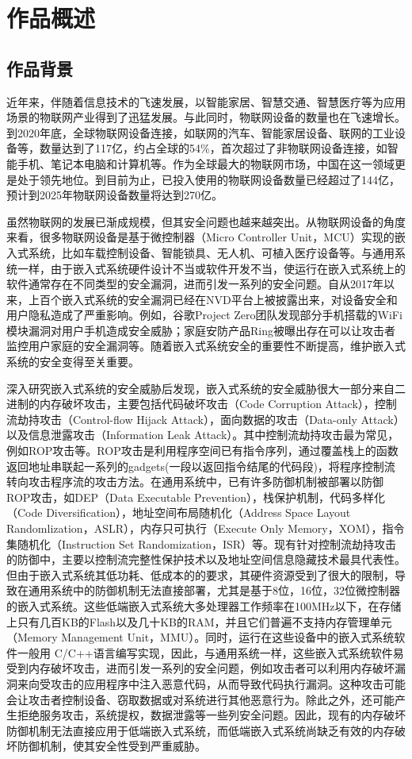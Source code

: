 \documentclass[12pt,a4paper]{ctexart}
\numberwithin{figure}{section}
\begin{document}
\section{作品概述}
\subsection{作品背景}
\par 近年来，伴随着信息技术的飞速发展，以智能家居、智慧交通、智慧医疗等为应用场景的物联网产业得到了迅猛发展。与此同时，物联网设备的数量也在飞速增长。到2020年底，全球物联网设备连接，如联网的汽车、智能家居设备、联网的工业设备等，数量达到了117亿，约占全球的54\%，首次超过了非物联网设备连接，如智能手机、笔记本电脑和计算机等。作为全球最大的物联网市场，中国在这一领域更是处于领先地位。到目前为止，已投入使用的物联网设备数量已经超过了144亿，预计到2025年物联网设备数量将达到270亿\cite{StateOfIOT}。
\par 虽然物联网的发展已渐成规模，但其安全问题也越来越突出。从物联网设备的角度来看，很多物联网设备是基于微控制器（Micro Controller Unit，MCU）实现的嵌入式系统，比如车载控制设备、智能锁具、无人机、可植入医疗设备等。与通用系统一样，由于嵌入式系统硬件设计不当或软件开发不当，使运行在嵌入式系统上的软件通常存在不同类型的安全漏洞，进而引发一系列的安全问题。自从2017年以来，上百个嵌入式系统的安全漏洞已经在NVD平台上被披露出来，对设备安全和用户隐私造成了严重影响。例如，谷歌Project Zero团队发现部分手机搭载的WiFi模块漏洞对用户手机造成安全威胁\cite{beniamini2017project}；家庭安防产品Ring被曝出存在可以让攻击者监控用户家庭的安全漏洞等\cite{Amazon}。随着嵌入式系统安全的重要性不断提高，维护嵌入式系统的安全变得至关重要。
\par 深入研究嵌入式系统的安全威胁后发现，嵌入式系统的安全威胁很大一部分来自二进制的内存破坏攻击，主要包括代码破坏攻击（Code Corruption Attack），控制流劫持攻击（Control-flow Hijack Attack），面向数据的攻击（Data-only Attack）以及信息泄露攻击（Information Leak Attack）。其中控制流劫持攻击最为常见，例如ROP攻击等。ROP攻击是利用程序空间已有指令序列，通过覆盖栈上的函数返回地址串联起一系列的gadgets(一段以返回指令结尾的代码段)，将程序控制流转向攻击程序流的攻击方法。在通用系统中，已有许多防御机制被部署以防御ROP攻击，如DEP（Data Executable Prevention），栈保护机制，代码多样化（Code Diversification），地址空间布局随机化（Address Space Layout Randomlization，ASLR），内存只可执行（Execute Only Memory，XOM），指令集随机化（Instruction Set Randomization，ISR）等。现有针对控制流劫持攻击的防御中，主要以控制流完整性保护技术以及地址空间信息隐藏技术最具代表性。但由于嵌入式系统其低功耗、低成本的的要求，其硬件资源受到了很大的限制，导致在通用系统中的防御机制无法直接部署，尤其是基于8位，16位，32位微控制器的嵌入式系统\cite{PositionPaper}。这些低端嵌入式系统大多处理器工作频率在100MHz以下，在存储上只有几百KB的Flash以及几十KB的RAM，并且它们普遍不支持内存管理单元（Memory Management Unit，MMU）。同时，运行在这些设备中的嵌入式系统软件一般用 C/C++语言编写实现，因此，与通用系统一样，这些嵌入式系统软件易受到内存破坏攻击，进而引发一系列的安全问题\cite{roemer2012return}，例如攻击者可以利用内存破坏漏洞来向受攻击的应用程序中注入恶意代码，从而导致代码执行漏洞。这种攻击可能会让攻击者控制设备、窃取数据或对系统进行其他恶意行为。除此之外，还可能产生拒绝服务攻击，系统提权，数据泄露等一些列安全问题。因此，现有的内存破坏防御机制无法直接应用于低端嵌入式系统，而低端嵌入式系统尚缺乏有效的内存破坏防御机制，使其安全性受到严重威胁。
\end{document}
